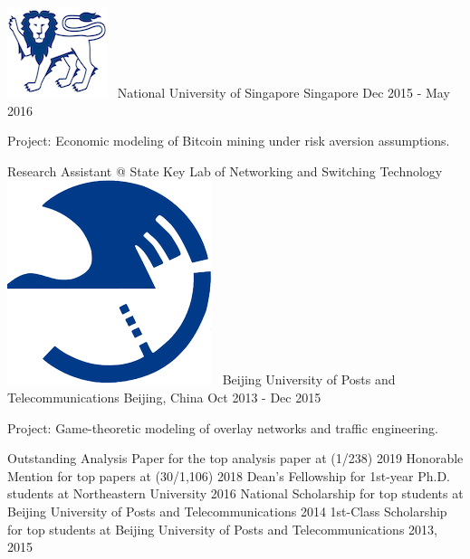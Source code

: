 \documentclass[letterpaper]{awesome-cv}
\begin{document}
\begin{cventries}
    {\includegraphics[height=0.017\textwidth]{../images/logos/nus.png}~ National University of Singapore}
    {Singapore}
    {Dec 2015 - May 2016}
    {
      \begin{cvitems}
        \item {Project: Economic modeling of Bitcoin mining under risk aversion assumptions.}
      \end{cvitems}
    }
  \cventry
    {Research Assistant @ State Key Lab of Networking and Switching Technology}
    {\includegraphics[height=0.017\textwidth]{../images/logos/bupt.png}~ Beijing University of Posts and Telecommunications}
    {Beijing, China}
    {Oct 2013 - Dec 2015}
    {
      \begin{cvitems}
        \item {Project: Game-theoretic modeling of overlay networks and traffic engineering.}
      \end{cvitems}
    }
\end{cventries}

\addvspace{1ex}
\begin{cventries}
  \cvaward
    {Outstanding Analysis Paper}
    {for the top analysis paper at  (1/238)}
    {2019}
  \cvaward
    {Honorable Mention}
    {for top papers at  (30/1,106)}
    {2018}
  \cvaward
    {Dean's Fellowship}
    {for 1st-year Ph.D. students at Northeastern University}
    {2016}
  \cvaward
    {National Scholarship}
    {for top students at Beijing University of Posts and Telecommunications}
    {2014}
  \cvaward
    {1st-Class Scholarship}
    {for top students at Beijing University of Posts and Telecommunications}
    {2013, 2015}
\end{cventries}
\end{document}
